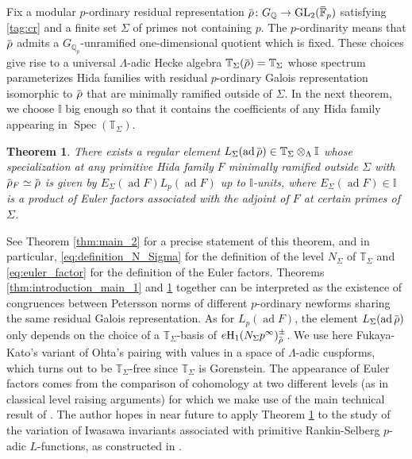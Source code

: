 \documentclass[12pt]{amsart}
\newcommand\bI{\mathbb{I}}
\newcommand\bQ{\mathbb{Q}}
\newcommand\bF{\mathbb{F}}
\newcommand\bT{\mathbb{T}}
\newcommand\Qp{{\mathbb{Q}_p}}
\newcommand{\ob}[1]{\mkern 1.5mu\overline{\mkern-1.5mu#1\mkern-1.5mu}\mkern 1.5mu}
\DeclareMathOperator{\ad}{ad}
\DeclareMathOperator{\GL}{GL}
\DeclareMathOperator{\Spec}{Spec}
\newcommand{\HH}{\mathrm{H}}
\theoremstyle{defstyle}
\theoremstyle{thmstyle}
\newtheorem{THM}{Theorem}
\begin{document}
Fix a modular $p$-ordinary residual representation $\ob{\rho}\colon G_\bQ\to \GL_2(\ob{\bF}_p)$ satisfying \eqref{tag:cr} and a finite set $\Sigma$ of primes not containing $p$. The $p$-ordinarity means that $\ob{\rho}$ admits a $G_{\Qp}$-unramified one-dimensional quotient which is fixed. These choices give rise to a universal $\Lambda$-adic Hecke algebra $\bT_\Sigma(\ob{\rho})=\bT_\Sigma$ whose spectrum parameterizes Hida families with residual $p$-ordinary Galois representation isomorphic to $\ob{\rho}$ that are minimally ramified outside of $\Sigma$. In the next theorem, we choose $\bI$ big enough so that it contains the coefficients of any Hida family appearing in $\Spec(\bT_\Sigma)$.

\begin{THM}\label{thm:introduction_main_2}
	There exists a regular element $L_\Sigma(\ad \ob{\rho})\in\bT_\Sigma\otimes_\Lambda\bI$ whose specialization at any primitive Hida family $F$ minimally ramified outside $\Sigma$ with $\ob{\rho}_F\simeq\ob{\rho}$ is given by $E_\Sigma(\ad F)L_p(\ad F)$ up to $\bI$-units, where $E_\Sigma(\ad F)\in\bI$ is a product of Euler factors associated with the adjoint of $F$ at certain primes of $\Sigma$. 
\end{THM}
See Theorem \ref{thm:main_2} for a precise statement of this theorem, and in particular, \eqref{eq:definition_N_Sigma} for the definition of the level $N_\Sigma$ of $\bT_\Sigma$ and \eqref{eq:euler_factor} for the definition of the Euler factors. 
Theorems \ref{thm:introduction_main_1} and \ref{thm:introduction_main_2} together can be interpreted as the existence of congruences between Petersson norms of different $p$-ordinary newforms sharing the same residual Galois representation.
As for $L_p(\ad F)$, the element $L_\Sigma(\ad \ob{\rho})$ only depends on the choice of a $\bT_\Sigma$-basis of $e\HH_1(N_\Sigma p^\infty)_{\ob{\rho}}^\pm$.
We use here Fukaya-Kato's variant of Ohta's pairing with values in a space of $\Lambda$-adic cuspforms, which turns out to be $\bT_\Sigma$-free since $\bT_\Sigma$ is Gorenstein.
The appearance of Euler factors comes from the comparison of cohomology at two different levels (as in classical level raising arguments) for which we make use of the main technical result of \cite{emerton2006variation}. 
The author hopes in near future to apply Theorem \ref{thm:introduction_main_2} to the study of the variation of Iwasawa invariants associated with primitive Rankin-Selberg $p$-adic $L$-functions, as constructed in \cite{chenhsieh}. 
\end{document}
